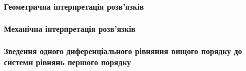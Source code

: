\documentclass[a4paper, 12pt]{article}
\theoremstyle{definition}
\numberwithin{equation}{section}%
\numberwithin{equation}{subsection}
\begin{document}


\subsubsection{Геометрична інтерпретація розв’язків}



\subsubsection{Механічна інтерпретація розв’язків}



\subsubsection{Зведення одного диференціального рівняння вищого порядку до системи рівнянь першого порядку}


\end{document}
